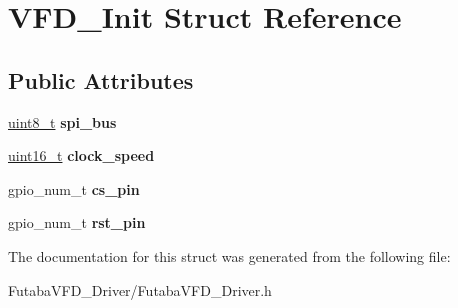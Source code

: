 \hypertarget{structVFD__Init}{}\section{V\+F\+D\+\_\+\+Init Struct Reference}
\label{structVFD__Init}
\subsection*{Public Attributes}
\begin{DoxyCompactItemize}
\item 
\mbox{\label{structVFD__Init_a11373a800afc912159f5234dc5d3a4a1}} 
\hyperlink{vl53l0x__types_8h_aba7bc1797add20fe3efdf37ced1182c5}{uint8\+\_\+t} {\bfseries spi\+\_\+bus}
\item 
\mbox{\label{structVFD__Init_a48d6d57a79c4658692127c5fb42c97fc}} 
\hyperlink{vl53l0x__types_8h_a273cf69d639a59973b6019625df33e30}{uint16\+\_\+t} {\bfseries clock\+\_\+speed}
\item 
\mbox{\label{structVFD__Init_aa00735627b22df6811c65d98d95dec4c}} 
gpio\+\_\+num\+\_\+t {\bfseries cs\+\_\+pin}
\item 
\mbox{\label{structVFD__Init_ace7aabc2a7ec3baa3c5691013e057d48}} 
gpio\+\_\+num\+\_\+t {\bfseries rst\+\_\+pin}
\end{DoxyCompactItemize}


The documentation for this struct was generated from the following file\+:\begin{DoxyCompactItemize}
\item 
Futaba\+V\+F\+D\+\_\+\+Driver/Futaba\+V\+F\+D\+\_\+\+Driver.\+h\end{DoxyCompactItemize}
